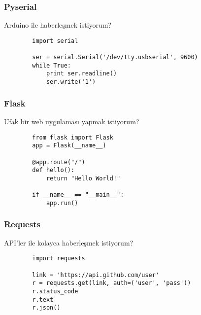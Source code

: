 \documentclass[10pt, compress]{beamer}
\begin{document}


\begin{frame}[fragile]
    \frametitle{Pyserial}
    \begin{center}
        Arduino ile haberleşmek istiyorum?
    
      \begin{verbatim}
        import serial
        
        ser = serial.Serial('/dev/tty.usbserial', 9600)
        while True:
            print ser.readline()
            ser.write('1')
      \end{verbatim}
      \end{center}  
\end{frame}


\begin{frame}[fragile]
    \frametitle{Flask}
    \begin{center}
        Ufak bir web uygulaması yapmak istiyorum?
    \end{center}  
      \begin{verbatim}
        from flask import Flask
        app = Flask(__name__)
        
        @app.route("/")
        def hello():
            return "Hello World!"
        
        if __name__ == "__main__":
            app.run()
      \end{verbatim}
\end{frame}


\begin{frame}[fragile]
    \frametitle{Requests}
    \begin{center}
        API'ler ile kolayca haberleşmek istiyorum?
    \end{center}  
      \begin{verbatim}
        import requests
        
        link = 'https://api.github.com/user'
        r = requests.get(link, auth=('user', 'pass'))
        r.status_code
        r.text
        r.json()
      \end{verbatim}
\end{frame}
\end{document}
